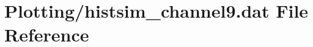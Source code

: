 \hypertarget{Plotting_2histsim__channel9_8dat}{}\section{Plotting/histsim\+\_\+channel9.dat File Reference}
\label{Plotting_2histsim__channel9_8dat}
